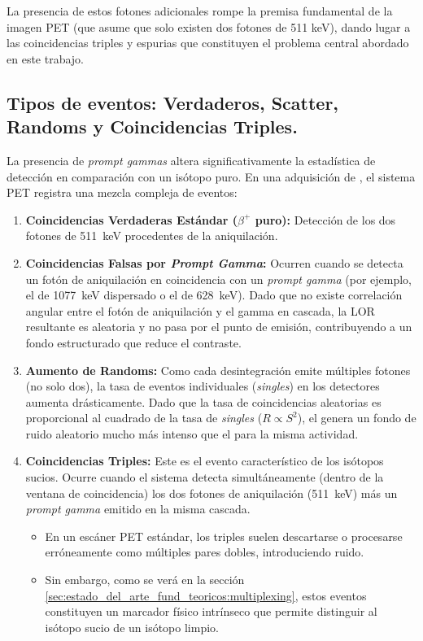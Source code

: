 La presencia de estos fotones adicionales rompe la premisa fundamental de la imagen PET (que asume que solo existen dos fotones de 511 keV), dando lugar a las coincidencias triples y espurias que constituyen el problema central abordado en este trabajo.

\subsection{Tipos de eventos: Verdaderos, Scatter, Randoms y Coincidencias Triples.}
La presencia de \textit{prompt gammas} altera significativamente la estadística de detección en comparación con un isótopo puro. En una adquisición de \yochoseis, el sistema PET registra una mezcla compleja de eventos:

\begin{enumerate}
      \item \textbf{Coincidencias Verdaderas Estándar ($\beta^+$ puro):} Detección de los dos fotones de \SI{511}{\kilo\electronvolt} procedentes de la aniquilación.
      \item \textbf{Coincidencias Falsas por \textit{Prompt Gamma}:} Ocurren cuando se detecta un fotón de aniquilación en coincidencia con un \textit{prompt gamma} (por ejemplo, el de \SI{1077}{\kilo\electronvolt} dispersado o el de \SI{628}{\kilo\electronvolt}). Dado que no existe correlación angular entre el fotón de aniquilación y el gamma en cascada, la LOR resultante es aleatoria y no pasa por el punto de emisión, contribuyendo a un fondo estructurado que reduce el contraste.
      \item \textbf{Aumento de Randoms:} Como cada desintegración emite múltiples fotones (no solo dos), la tasa de eventos individuales (\emph{singles}) en los detectores aumenta drásticamente. Dado que la tasa de coincidencias aleatorias es proporcional al cuadrado de la tasa de \emph{singles} ($R \propto S^2$), el \yochoseis genera un fondo de ruido aleatorio mucho más intenso que el \fdiezocho para la misma actividad.
      \item \textbf{Coincidencias Triples:} Este es el evento característico de los isótopos sucios. Ocurre cuando el sistema detecta simultáneamente (dentro de la ventana de coincidencia) los dos fotones de aniquilación (\SI{511}{\kilo\electronvolt}) más un \textit{prompt gamma} emitido en la misma cascada.
            \begin{itemize}
                  \item En un escáner PET estándar, los triples suelen descartarse o procesarse erróneamente como múltiples pares dobles, introduciendo ruido.
                  \item Sin embargo, como se verá en la sección \ref{sec:estado_del_arte_fund_teoricos:multiplexing}, estos eventos constituyen un marcador físico intrínseco que permite distinguir al isótopo sucio de un isótopo limpio.
            \end{itemize}


\end{enumerate}
